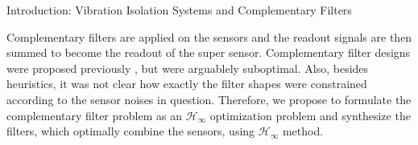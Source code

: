 \documentclass{beamer}
\begin{document}
\begin{frame}[t]
\begin{columns}[t]
\begin{column}{0.32\linewidth}
\begin{block}{Introduction: Vibration Isolation Systems and Complementary Filters}
				\medskip
				
				Complementary filters are applied on the sensors and the readout signals are then summed to become the readout of the super sensor.
				Complementary filter designs were proposed previously \cite{Sekiguchi:2016bmv,vanHeijningen:2018cpc,low_frequency_optimization_and_performance_of_advanced_virgo_seismic_isolation_system}, but were arguablely suboptimal.
				Also, besides heuristics, it was not clear how exactly the filter shapes were constrained according to the sensor noises in question.
				Therefore, we propose to formulate the complementary filter problem as an $\mathcal{H}_\infty$ optimization problem and synthesize the filters, which optimally combine the sensors, using $\mathcal{H}_\infty$ method.
%				
%				
			\end{block}
				

\end{column}
\end{columns}
\end{frame}
\end{document}
